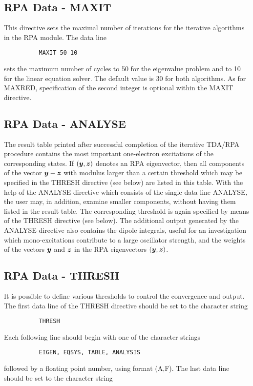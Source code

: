 \documentclass[11pt,fleqn]{article}
\newcommand{\yvec}{\mbox{\boldmath $y$}}
\newcommand{\zvec}{\mbox{\boldmath $z$}}
\begin{document}
\subsection{RPA Data - MAXIT}
This directive sets the maximal number of iterations for the iterative
algorithms in the RPA module. The data line

{
\footnotesize
\begin{verbatim}
          MAXIT 50 10
\end{verbatim}
}
sets the maximum number of cycles to 50 for the eigenvalue problem and to
10 for the linear equation solver. The default value is 30 for both 
algorithms. As for MAXRED, specification of the second integer is
optional within the MAXIT directive.
%
\subsection{RPA Data - ANALYSE}
The result table printed after successful completion of the iterative
TDA/RPA procedure contains the most important one-electron excitations
of the corresponding states. If $(\yvec,\zvec)$ denotes an RPA eigenvector,
then all components of the vector $\yvec - \zvec$ with modulus larger than a
certain threshold which may be specified in the THRESH directive
(see below) are listed in this table. With the help of the ANALYSE
directive which consists of the single data line ANALYSE, the user may,
in addition, examine smaller components, without having them listed in
the result table. The corresponding threshold is again specified by means
of the THRESH directive (see below). The additional output generated
by the ANALYSE directive also contains the dipole integrals, useful
for an investigation which mono-excitations contribute to a large
oscillator strength, and the weights of the vectors $\yvec$ and $\zvec$
in the RPA eigenvectors $(\yvec,\zvec)$.
%
\subsection{RPA Data - THRESH}
It is possible to define various thresholds to control the convergence
and output. The first data line of the THRESH directive should be set to
the character string

{
\footnotesize
\begin{verbatim}
          THRESH
\end{verbatim}
}
Each following line should begin with one of the character strings
{
\footnotesize
\begin{verbatim}
          EIGEN, EQSYS, TABLE, ANALYSIS
\end{verbatim}
}
followed by a floating point number, using format (A,F). The last data line
should be set to the character string
\end{document}
